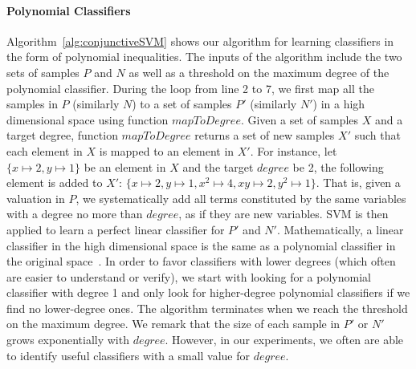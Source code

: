 \paragraph{Polynomial Classifiers} Algorithm~\ref{alg:conjunctiveSVM} shows our algorithm for learning classifiers in the form of polynomial inequalities. 
The inputs of the algorithm include the two sets of samples $P$ and $N$ as well as a threshold on the maximum degree of the polynomial classifier. 
During the loop from line 2 to 7, we first map all the samples in $P$ (similarly $N$) to a set of samples $P'$ (similarly $N'$) in a high dimensional space using function $\mathit{mapToDegree}$. 
Given a set of samples $X$ and a target degree, function $\mathit{mapToDegree}$ returns a set of new samples $X'$ such that each element in $X$ is mapped to an element in $X'$. 
For instance, let $\{x \mapsto 2, y \mapsto 1\}$ be an element in $X$ and the target $\mathit{degree}$ be 2, the following element is added to $X'$: $\{x \mapsto 2, y \mapsto 1, x^2 \mapsto 4, xy \mapsto 2, y^2 \mapsto 1\}$. 
That is, given a valuation in $P$, we systematically add all terms constituted by the same variables with a degree no more than $\mathit{degree}$, as if they are new variables.
SVM is then applied to learn a perfect linear classifier for $P'$ and $N'$. %
Mathematically, a linear classifier in the high dimensional space is the same as a polynomial classifier in the original space~\cite{???}. 
In order to favor classifiers with lower degrees (which often are easier to understand or verify), we start with looking for a polynomial classifier with degree 1 and only look for higher-degree polynomial classifiers if we find no lower-degree ones. 
The algorithm terminates when we reach the threshold on the maximum degree. 
We remark that the size of each sample in $P'$ or $N'$ grows exponentially with $\mathit{degree}$. 
However, in our experiments, we often are able to identify useful classifiers with a small value for $\mathit{degree}$.

